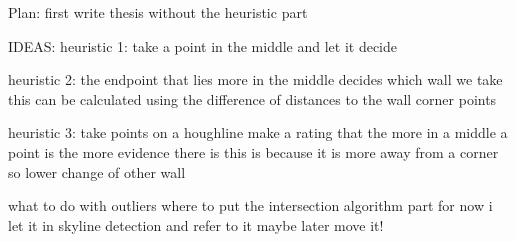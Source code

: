 Plan:
first write thesis without the heuristic part

IDEAS:
heuristic 1:
take a point in the middle and let it decide

heuristic 2:
the endpoint that lies more in the middle decides which wall we take
this can be calculated using the difference of distances to the wall corner points

heuristic 3:
take points on a houghline
make a rating that the more in a middle a point is the more evidence there is
this is because it is more away from a corner so lower change of other wall


what to do with outliers
where to put the intersection algorithm part
for now i let it in skyline detection and refer to it
maybe later move it!



